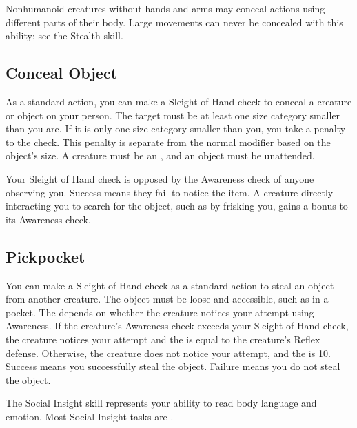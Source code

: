         Nonhumanoid creatures without hands and arms may conceal actions using different parts of their body. Large movements can never be concealed with this ability; see the Stealth skill.

    \subsection{Conceal Object}
        As a standard action, you can make a Sleight of Hand check to conceal a creature or object on your person.
        The target must be at least one size category smaller than you are.
        If it is only one size category smaller than you, you take a  penalty to the check.
        This penalty is separate from the normal modifier based on the object's size.
        A creature must be an , and an object must be unattended.

        Your Sleight of Hand check is opposed by the Awareness check of anyone observing you.
        Success means they fail to notice the item. A creature directly interacting you to search for the object, such as by frisking you, gains a  bonus to its Awareness check.

    \subsection{Pickpocket}
        You can make a Sleight of Hand check as a standard action to steal an object from another creature. The object must be loose and accessible, such as in a pocket. The  depends on whether the creature notices your attempt using Awareness. If the creature's Awareness check exceeds your Sleight of Hand check, the creature notices your attempt and the  is equal to the creature's Reflex defense. Otherwise, the creature does not notice your attempt, and the  is 10. Success means you successfully steal the object. Failure means you do not steal the object.

\newpage
{}
        The Social Insight skill represents your ability to read body language and emotion.
        Most Social Insight tasks are .

